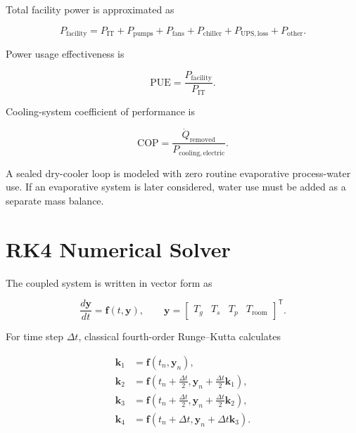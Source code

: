 \documentclass[11pt]{article}
\begin{document}
Total facility power is approximated as

\begin{equation}
P_{\mathrm{facility}}
=P_{\mathrm{IT}}
+P_{\mathrm{pumps}}
+P_{\mathrm{fans}}
+P_{\mathrm{chiller}}
+P_{\mathrm{UPS,loss}}
+P_{\mathrm{other}}.
\end{equation}

Power usage effectiveness is

\begin{equation}
\mathrm{PUE}
=\frac{P_{\mathrm{facility}}}{P_{\mathrm{IT}}}.
\end{equation}

Cooling-system coefficient of performance is

\begin{equation}
\mathrm{COP}
=\frac{\dot Q_{\mathrm{removed}}}{P_{\mathrm{cooling,electric}}}.
\end{equation}

A sealed dry-cooler loop is modeled with zero routine evaporative process-water use.
If an evaporative system is later considered, water use must be added as a separate
mass balance.

\section{RK4 Numerical Solver}

The coupled system is written in vector form as

\begin{equation}
\frac{d\mathbf{y}}{dt}=\mathbf{f}(t,\mathbf{y}),
\qquad
\mathbf{y}
=\begin{bmatrix}
T_g & T_s & T_p & T_{\mathrm{room}}
\end{bmatrix}^{\mathsf T}.
\end{equation}

For time step \(\Delta t\), classical fourth-order Runge--Kutta calculates

\begin{align}
\mathbf{k}_1&=\mathbf{f}(t_n,\mathbf{y}_n),\\
\mathbf{k}_2&=\mathbf{f}\left(t_n+\frac{\Delta t}{2},
\mathbf{y}_n+\frac{\Delta t}{2}\mathbf{k}_1\right),\\
\mathbf{k}_3&=\mathbf{f}\left(t_n+\frac{\Delta t}{2},
\mathbf{y}_n+\frac{\Delta t}{2}\mathbf{k}_2\right),\\
\mathbf{k}_4&=\mathbf{f}\left(t_n+\Delta t,
\mathbf{y}_n+\Delta t\mathbf{k}_3\right).
\end{align}
\end{document}
